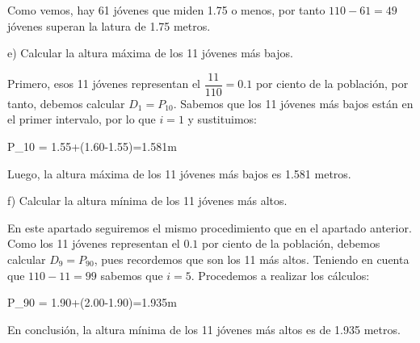 Como vemos, hay 61 jóvenes que miden 1.75 o menos, por tanto $110-61=49$ jóvenes superan la latura de 1.75 metros.

e) Calcular la altura máxima de los 11 jóvenes más bajos.

Primero, esos 11 jóvenes representan el $\dfrac{11}{110}=0.1$ por ciento de la población, por tanto, debemos calcular $D_{1} = P_{10}$. Sabemos que los 11 jóvenes más bajos están en el primer intervalo, por lo que $i=1$ y sustituimos:

\begin{center}
    \begin{*gather}
        P_{10} = 1.55+(1.60-1.55)=1.581m
    \end{*gather}
\end{center}

Luego, la altura máxima de los 11 jóvenes más bajos es 1.581 metros.

f) Calcular la altura mínima de los 11 jóvenes más altos.

En este apartado seguiremos el mismo procedimiento que en el apartado anterior. Como los 11 jóvenes representan el $0.1$ por ciento de la población, debemos calcular $D_{9} = P_{90}$, pues recordemos que son los 11 más altos. Teniendo en cuenta que $110-11=99$ sabemos que $i=5$. Procedemos a realizar los cálculos:

\begin{center}
    \begin{*gather}
        P_{90} = 1.90+(2.00-1.90)=1.935m
    \end{*gather}
\end{center}

En conclusión, la altura mínima de los 11 jóvenes más altos es de 1.935 metros. 
